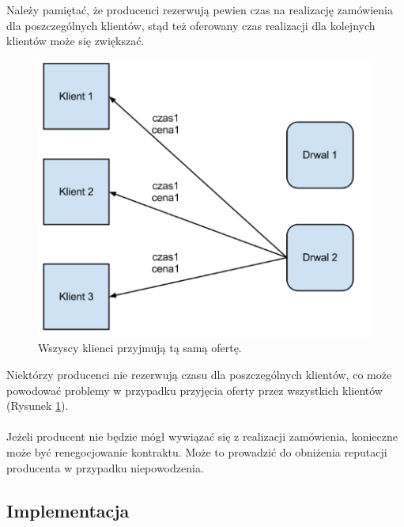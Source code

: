 \documentclass[a4paper,12pt]{article}
\begin{document}
Należy pamiętać, że producenci rezerwują pewien czas na realizację zamówienia dla poszczególnych klientów, stąd też oferowany czas realizacji dla kolejnych klientów może się zwiększać.

\begin{figure}[!]
\centering
\includegraphics[scale=1]{gfx/PlatformaWymianyDobr-img4.png}
\caption{Wszyscy klienci przyjmują tą samą ofertę.}
\label{oper3}
\end{figure}

Niektórzy producenci nie rezerwują czasu dla poszczególnych klientów, co może powodować problemy w przypadku przyjęcia oferty przez wszystkich klientów (Rysunek \ref{oper3}).
\\ \\
Jeżeli producent nie będzie mógł wywiązać się z realizacji zamówienia, konieczne może być renegocjowanie kontraktu. Może to prowadzić do obniżenia reputacji producenta w przypadku niepowodzenia.

\newpage

\subsection{Implementacja}
\end{document}

